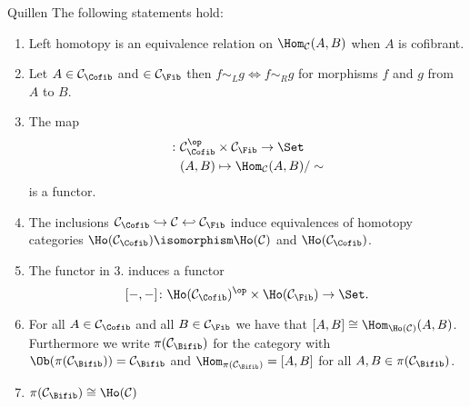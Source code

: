 \begin{thm}{Quillen}
The following statements hold:
    \begin{enumerate}
        \item 
        Left homotopy is an equivalence relation on $\Hom_{\mathcal{C}}(A,B)$ when $A$ is cofibrant.
        \item 
        Let $A \in \mathcal{C}_{\Cofib}$ and $ \in \mathcal{C}_{\Fib}$ then $f \sim_L g \iff f \sim_R g$ for morphisms $f$ and $g$ from $A$ to $B$.
        \item 
        The map 
        \begin{align*}
            [-,-] \colon & \mathcal{C}^{\op}_{\Cofib} \times \mathcal{C}_{\Fib} \to \Set
            \\
            &(A,B) \mapsto \Hom_{\mathcal{C}}(A,B)/\sim
        \end{align*}
        is a functor.
        \item 
        The inclusions $\mathcal{C}_{\Cofib} \hookrightarrow \mathcal{C} \hookleftarrow\mathcal{C}_{\Fib}$ induce equivalences of homotopy categories
        $ \Ho( \mathcal{C}_{\Cofib}) \isomorphism \Ho(\mathcal{C})$ and $\Ho( \mathcal{C}_{\Cofib} )$.
        \item 
        The functor in 3. induces a functor 
        \[
        [-,-]\colon \Ho( \mathcal{C_{\Cofib}})^{\op} \times  \Ho(\mathcal{C}_{\Fib}) \to \Set.
        \]
        \item 
        For all $A \in  \mathcal{C}_{\Cofib}$ and all $B \in \mathcal{C}_{\Fib}$ we have that $[A,B] \cong  \Hom_{\Ho(\mathcal{C})}(A,B)$.
        Furthermore we write $\pi ( \mathcal{C}_{\Bifib})$ for the category with $\Ob(\pi ( \mathcal{C}_{\Bifib}))=\mathcal{C}_{\Bifib}$ and $\Hom_{\pi ( \mathcal{C}_{\Bifib})}=[A,B]$ for all $A,B \in \pi ( \mathcal{C}_{\Bifib})$.
        \item 
        $\pi( \mathcal{C}_{\Bifib}) \cong \Ho(\mathcal{C})$
    \end{enumerate}
\end{thm}

